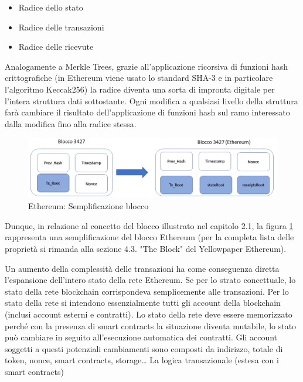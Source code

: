 \begin{itemize}
\item Radice dello stato
\item Radice delle transazioni
\item Radice delle ricevute
\end{itemize}

Analogamente a Merkle Trees, grazie all'applicazione ricorsiva di funzioni hash crittografiche (in Ethereum viene usato lo standard SHA-3 e in particolare l'algoritmo Keccak256) la radice diventa una sorta di impronta digitale per l'intera struttura dati sottostante. Ogni modifica a qualsiasi livello della struttura farà cambiare il risultato dell'applicazione di funzioni hash sul ramo interessato dalla modifica fino alla radice stessa. 

\begin{figure}[H]
\centering
\includegraphics[width=1\textwidth]{immagini/EthBlockSimplified.png}
\caption{Ethereum: Semplificazione blocco}
\label{fig:BloccoEthereumSemplif}
\end{figure}

Dunque, in relazione al concetto del blocco illustrato nel capitolo 2.1, la figura \ref{fig:BloccoEthereumSemplif} rappresenta una semplificazione del blocco Ethereum (per la completa lista delle proprietà si rimanda alla sezione 4.3. "The Block" del Yellowpaper Ethereum).

Un aumento della complessità delle transazioni ha come conseguenza diretta l’espansione dell’intero stato della rete Ethereum. Se per lo strato concettuale, lo stato della rete blockchain corrispondeva semplicemente alle transazioni. 
Per lo stato della rete si intendono essenzialmente tutti gli account della blockchain (inclusi account esterni e contratti). Lo stato della rete deve essere memorizzato perché con la presenza di smart contracts la situazione diventa mutabile, lo stato può cambiare in seguito all’esecuzione automatica dei contratti. Gli account soggetti a questi potenziali cambiamenti sono composti da indirizzo, totale di token, nonce, smart contracts, storage… 
La logica transazionale (estesa con i smart contracts)

